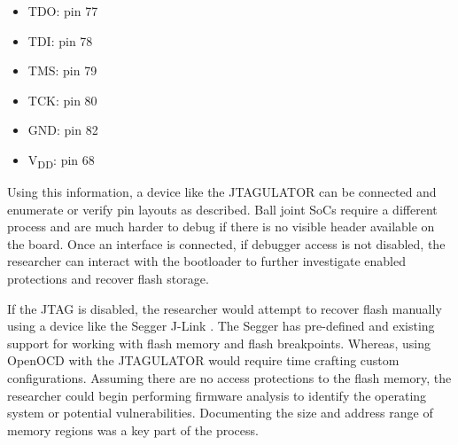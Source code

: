 \begin{itemize}
  \item TDO: pin 77
  \item TDI: pin 78
  \item TMS: pin 79
  \item TCK: pin 80
  \item GND: pin 82
  \item V\textsubscript{DD}: pin 68
\end{itemize}

Using this information, a device like the JTAGULATOR \autocite{JTAGulator2023} can be connected and enumerate or verify pin layouts as described. Ball joint SoCs require a different process and are much harder to debug if there is no visible header available on the board. Once an interface is connected, if debugger access is not disabled, the researcher can interact with the bootloader to further investigate enabled protections and recover flash storage.

If the JTAG is disabled, the researcher would attempt to recover flash manually using a device like the Segger J-Link \autocite{SEGGERJLinkDebug}. The Segger has pre-defined and existing support for working with flash memory and flash breakpoints. Whereas, using OpenOCD with the JTAGULATOR would require time crafting custom configurations. Assuming there are no access protections to the flash memory, the researcher could begin performing firmware analysis to identify the operating system or potential vulnerabilities. Documenting the size and address range of memory regions was a key part of the process.